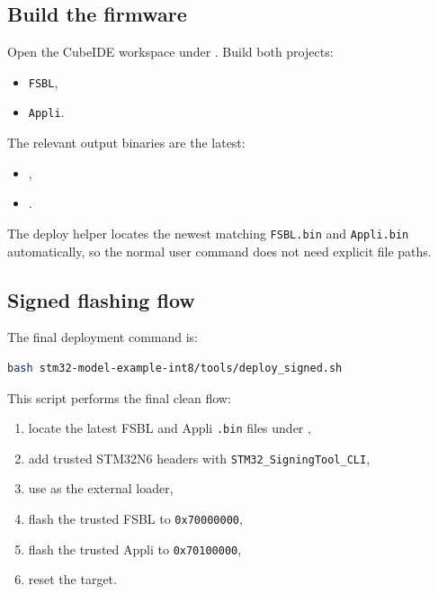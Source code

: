 \documentclass[11pt,a4paper]{article}
\begin{document}
\subsection{Build the firmware}

Open the CubeIDE workspace under . Build
both projects:

\begin{itemize}
\item \texttt{FSBL},
\item \texttt{Appli}.
\end{itemize}

The relevant output binaries are the latest:

\begin{itemize}
\item {},
\item {}.
\end{itemize}

The deploy helper locates the newest matching \texttt{FSBL.bin} and \texttt{Appli.bin}
automatically, so the normal user command does not need explicit file paths.

\subsection{Signed flashing flow}

The final deployment command is:

\begin{lstlisting}[language=bash]
bash stm32-model-example-int8/tools/deploy_signed.sh
\end{lstlisting}

This script performs the final clean flow:

\begin{enumerate}
\item locate the latest FSBL and Appli \texttt{.bin} files under ,
\item add trusted STM32N6 headers with \texttt{STM32\_SigningTool\_CLI},
\item use  as the external loader,
\item flash the trusted FSBL to \texttt{0x70000000},
\item flash the trusted Appli to \texttt{0x70100000},
\item reset the target.
\end{enumerate}
\end{document}

